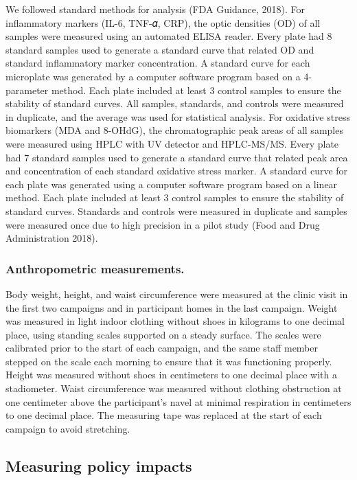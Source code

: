 \documentclass[
  letterpaper,
  DIV=11,
  numbers=noendperiod]{scrartcl}
\begin{document}
We followed standard methods for analysis (FDA Guidance, 2018). For
inflammatory markers (IL-6, TNF-𝛼, CRP), the optic densities (OD) of all
samples were measured using an automated ELISA reader. Every plate had 8
standard samples used to generate a standard curve that related OD and
standard inflammatory marker concentration. A standard curve for each
microplate was generated by a computer software program based on a
4-parameter method. Each plate included at least 3 control samples to
ensure the stability of standard curves. All samples, standards, and
controls were measured in duplicate, and the average was used for
statistical analysis. For oxidative stress biomarkers (MDA and 8-OHdG),
the chromatographic peak areas of all samples were measured using HPLC
with UV detector and HPLC-MS/MS. Every plate had 7 standard samples used
to generate a standard curve that related peak area and concentration of
each standard oxidative stress marker. A standard curve for each plate
was generated using a computer software program based on a linear
method. Each plate included at least 3 control samples to ensure the
stability of standard curves. Standards and controls were measured in
duplicate and samples were measured once due to high precision in a
pilot study (Food and Drug Administration 2018).

\hypertarget{anthropometric-measurements.}{%
\subsubsection{Anthropometric
measurements.}\label{anthropometric-measurements.}}

Body weight, height, and waist circumference were measured at the clinic
visit in the first two campaigns and in participant homes in the last
campaign. Weight was measured in light indoor clothing without shoes in
kilograms to one decimal place, using standing scales supported on a
steady surface. The scales were calibrated prior to the start of each
campaign, and the same staff member stepped on the scale each morning to
ensure that it was functioning properly. Height was measured without
shoes in centimeters to one decimal place with a stadiometer. Waist
circumference was measured without clothing obstruction at one
centimeter above the participant's navel at minimal respiration in
centimeters to one decimal place. The measuring tape was replaced at the
start of each campaign to avoid stretching.

\hypertarget{measuring-policy-impacts}{%
\subsection{Measuring policy impacts}\label{measuring-policy-impacts}}
\end{document}
